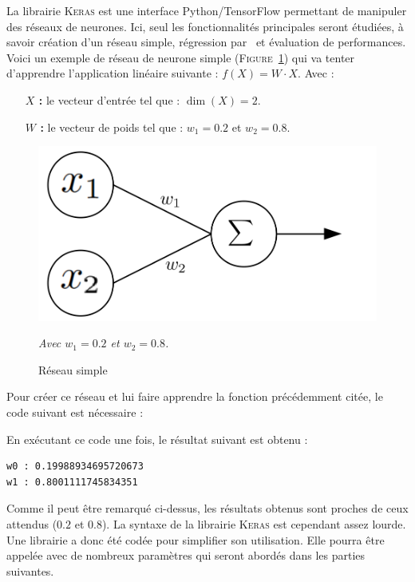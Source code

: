La librairie \textsc{Keras} est une interface Python/TensorFlow\cite{tf} permettant de manipuler des réseaux de neurones.
Ici, seul les fonctionnalités principales seront étudiées,
à savoir
création d'un réseau simple,
régression par \sgd\
et évaluation de performances.\\


Voici un exemple de réseau de neurone simple (\textsc{Figure}\ \ref{fig:net2})
qui va tenter d'apprendre l'application linéaire suivante : $f(X) = W\cdot X$.
Avec :
\begin{itemize}
    \item[\textbf{$X$ :}] le vecteur d'entrée tel que : $\dim(X) = 2$.
    \item[\textbf{$W$ :}] le vecteur de poids tel que : $w_1 = 0.2$ et $w_2 = 0.8$.
\end{itemize}
\begin{figure}[H]
    \center
    \includegraphics[height=\moyen]{pict/net2.png}
	\caption{Réseau simple}
    \vspace{-10pt}
    \begin{center}
        \footnotesize
        \textit{
        Avec $w_1 = 0.2$ et $w_2 = 0.8$.
        }
    \end{center}
	\label{fig:net2}
\end{figure}
\vspace{-12pt}


Pour créer ce réseau et lui faire apprendre la fonction précédemment citée,
le code suivant est nécessaire :



En exécutant ce code une fois, le résultat suivant est obtenu :
\begin{lstlisting}
w0 : 0.19988934695720673
w1 : 0.8001111745834351
\end{lstlisting}

Comme il peut être remarqué ci-dessus, les résultats obtenus sont proches de ceux attendus ($0.2$ et $0.8$).
La syntaxe de la librairie \textsc{Keras} est cependant assez lourde.
Une librairie a donc été codée pour simplifier son utilisation.
Elle pourra être appelée avec de nombreux paramètres qui seront abordés dans les parties suivantes.\\


